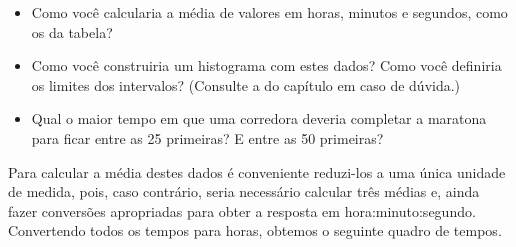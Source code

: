 \begin{reflection}
\begin{itemize}
\item {} 
Como você calcularia a média de valores em horas, minutos e segundos,  como os da tabela?

\item {} 
Como você construiria um histograma com estes dados? Como você definiria os limites dos intervalos? (Consulte a  do capítulo  em caso de dúvida.)

\item {} 
Qual o maior tempo em que uma corredora deveria completar a maratona para ficar entre as 25 primeiras? E entre as 50 primeiras?

\end{itemize}
\end{reflection}

Para calcular a média destes dados é conveniente reduzi-los a uma única unidade de medida, pois, caso contrário, seria necessário calcular três médias e, ainda fazer conversões apropriadas para obter a resposta em hora:minuto:segundo. Convertendo todos os tempos para horas, obtemos o seguinte quadro de tempos.


